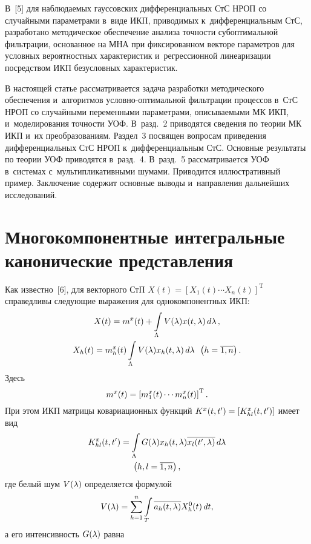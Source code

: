 \begin{multicols}{2}
В~[5] для наблюдаемых гауссовских дифференциальных СтС НРОП со случайными 
параметрами в~виде ИКП, приводимых к~дифференциальным СтС, разработано 
методическое обеспечение анализа точности субоптимальной фильтрации, основанное 
на МНА при фиксированном векторе параметров для условных вероятностных 
характеристик и~регрессионной линеаризации посредством ИКП безусловных 
характеристик.

В настоящей статье рассматривается задача разработки методического обеспечения 
и~алгоритмов услов\-но-оп\-ти\-маль\-ной фильт\-ра\-ции процессов в~СтС НРОП со случайными 
переменными параметрами, описываемыми МК ИКП, и~моделирования точ\-ности УОФ. 
В~разд.~2 приводятся сведения по теории МК ИКП 
и~их преобразованиям. Раздел~3 посвящен вопросам приведения дифференциальных СтС 
НРОП к~дифференциальным СтС. Основные результаты по теории УОФ приводятся 
в~разд.~4. В~разд.~5 рассматривается УОФ в~системах с~мультипликативными 
шумами. Приводится иллюстративный пример. Заключение содержит основные выводы и~направления дальнейших исследований.


\section{Многокомпонентные интегральные канонические представления}

Как известно~[6], для векторного СтП $X(t) =[ X_1(t) \cdots X_n(t)]^{\mathrm{T}}$ 
справедливы следующие выражения для однокомпонентных ИКП:
    \begin{multline}
    X(t) = m^x (t) + \displaystyle\int\limits_\Lambda V(\lambda) x (t,\lambda) \,d\lambda\,,\\
    X_h(t) = m_h^x (t) \displaystyle \int\limits_\Lambda V(\lambda) x_h (t,\lambda) \,d\lambda\enskip 
\left(h=\overline{1,n}\right).
          \label{e2.1-s2}
     \end{multline}
%
Здесь 
$$
m^x (t) = \left[ m_1^x (t) \cdots m_n^x (t)\right]^{\mathrm{T}}.
$$
 При этом ИКП матрицы 
ковариационных функций $K^x (t, t') \hm= \lk K_{hl}^x (t,t')\rk$ имеет вид
       \begin{multline}
    K_{hl}^x (t,t') = \int\limits_\Lambda G(\lambda) x_h (t,\lambda) \overline{x_l(t',\lambda)} 
\,d\lambda \\
 \left( h,l=\overline{1,n}\right),
\label{e2.2-s2}
\end{multline}
где белый шум $V(\lambda)$  определяется формулой
    $$
    V(\lambda) = \sum\limits_{h=1}^n \int\limits_T \overline{a_h (t,\lambda)} X_h^0 (t)\,dt,
    $$
а его интенсивность $G(\lambda)$ равна


\end{multicols}

